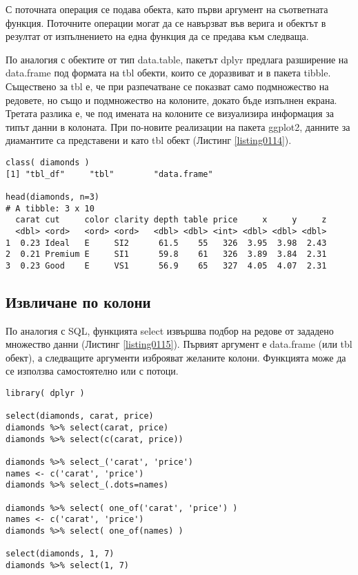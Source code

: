 С поточната операция се подава обекта, като първи аргумент на съответната функция. Поточните операции могат да се навързват във верига и обектът в резултат от изпълнението на една функция да се предава към следваща. 

По аналогия с обектите от тип data.table, пакетът dplyr предлага разширение на data.frame под формата на tbl обекти, които се доразвиват и в пакета tibble. Съществено за tbl е, че при разпечатване се показват само подмножество на редовете, но също и подмножество на колоните, докато бъде изпълнен екрана. Третата разлика е, че под имената на колоните се визуализира информация за типът данни в колоната. При по-новите реализации на пакета ggplot2, данните за диамантите са представени и като tbl обект (Листинг \ref{listing0114}).

\begin{lstlisting}[caption=Таблични данни в dplyr, label=listing0114]
class( diamonds )
[1] "tbl_df"     "tbl"        "data.frame"

head(diamonds, n=3)
# A tibble: 3 x 10
  carat cut     color clarity depth table price     x     y     z
  <dbl> <ord>   <ord> <ord>   <dbl> <dbl> <int> <dbl> <dbl> <dbl>
1  0.23 Ideal   E     SI2      61.5    55   326  3.95  3.98  2.43
2  0.21 Premium E     SI1      59.8    61   326  3.89  3.84  2.31
3  0.23 Good    E     VS1      56.9    65   327  4.05  4.07  2.31
\end{lstlisting}

\subsection{Извличане по колони}

По аналогия с SQL, функцията select извършва подбор на редове от зададено множество данни (Листинг \ref{listing0115}). Първият аргумент е data.frame (или tbl обект), а следващите аргументи изброяват желаните колони. Функцията може да се използва самостоятелно или с потоци.

\begin{lstlisting}[caption=Избор на редове, label=listing0115]
library( dplyr )

select(diamonds, carat, price)
diamonds %>% select(carat, price)
diamonds %>% select(c(carat, price))

diamonds %>% select_('carat', 'price')
names <- c('carat', 'price')
diamonds %>% select_(.dots=names)

diamonds %>% select( one_of('carat', 'price') )
names <- c('carat', 'price')
diamonds %>% select( one_of(names) )

select(diamonds, 1, 7)
diamonds %>% select(1, 7)
\end{lstlisting}

